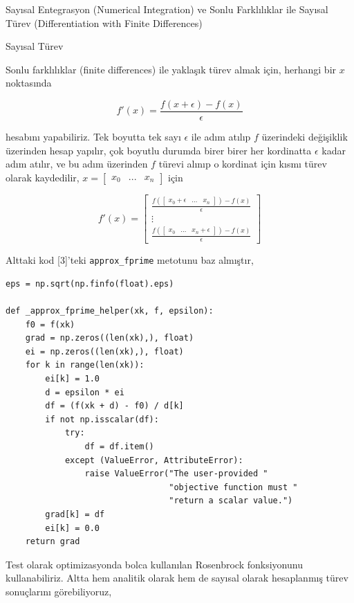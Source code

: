 \documentclass[12pt,fleqn]{article}\usepackage{../../common}
\begin{document}
Sayısal Entegrasyon (Numerical Integration) ve Sonlu Farklılıklar ile Sayısal Türev (Differentiation with Finite Differences)


Sayısal Türev

Sonlu farklılıklar (finite differences) ile yaklaşık türev almak için,
herhangi bir $x$ noktasında

$$
f'(x) = \frac{f(x + \epsilon) - f(x)}{\epsilon}
$$

hesabını yapabiliriz. Tek boyutta tek sayı $\epsilon$ ile adım atılıp $f$
üzerindeki değişiklik üzerinden hesap yapılır, çok boyutlu durumda birer
birer her kordinatta $\epsilon$ kadar adım atılır, ve bu adım üzerinden $f$
türevi alınıp o kordinat için kısmı türev olarak kaydedilir, $x =
\left[\begin{array}{ccc} x_0 & ... & x_n \end{array}\right]$ için

$$
f'(x) = \left[\begin{array}{c}
\frac{ f \left( [\begin{array}{ccc} x_0 + \epsilon & ... & x_n \end{array}]\right) - f(x)}{\epsilon} \\
\vdots \\
\frac{ f \left( [\begin{array}{ccc} x_0  & ... & x_n+\epsilon \end{array}]\right) - f(x)}{\epsilon} 
\end{array}\right]
$$

Alttaki kod [3]'teki \verb!approx_fprime! metotunu
baz almıştır, 

\begin{verbatim}
eps = np.sqrt(np.finfo(float).eps)

def _approx_fprime_helper(xk, f, epsilon):
    f0 = f(xk)
    grad = np.zeros((len(xk),), float)
    ei = np.zeros((len(xk),), float)
    for k in range(len(xk)):
        ei[k] = 1.0
        d = epsilon * ei
        df = (f(xk + d) - f0) / d[k]
        if not np.isscalar(df):
            try:
                df = df.item()
            except (ValueError, AttributeError):
                raise ValueError("The user-provided "
                                 "objective function must "
                                 "return a scalar value.")
        grad[k] = df
        ei[k] = 0.0
    return grad
\end{verbatim}

Test olarak optimizasyonda bolca kullanılan Rosenbrock fonksiyonunu
kullanabiliriz. Altta hem analitik olarak hem de sayısal olarak hesaplanmış
türev sonuçlarını görebiliyoruz,
\end{document}
